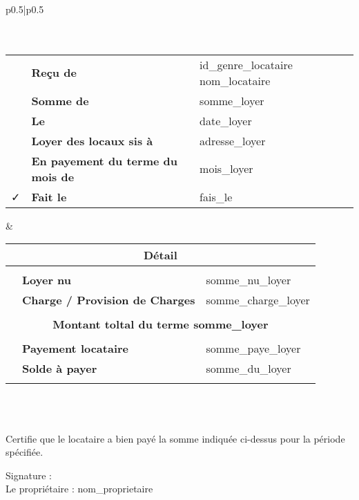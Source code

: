 \documentclass{article}
\begin{document}
\begin{tabular}{p{}|p{}}
	\hline 	
	\\
		\\
	\hline 
	\\
	\begin{tabular}{c>{\raggedleft\arraybackslash}p{}>{\raggedright\arraybackslash}p{}}
		\faFile{} &  \textbf{Reçu de} & {{id_genre_locataire}} {{nom_locataire}}\\
		\faMoney & 	\textbf{Somme de}	 & {{somme_loyer}}\\
		\faCalendar & \textbf{Le} & {{date_loyer}}\\
		\faMapMarker & \textbf{Loyer des locaux sis à } & {{adresse_loyer}}\\
		\faPencil & \textbf{En payement du terme du mois de} & {{mois_loyer}}\\
		\faCheck & \textbf{Fait le} & {{fais_le}}\\
	\end{tabular}
	& \setlength{\arrayrulewidth}{2pt} %
	\begin{tabular}{c>{\raggedleft\arraybackslash}p{}>{\raggedright\arraybackslash}p{}}	
		\multicolumn{3}{c}{\bf Détail}\\
		\hline \\
		\faHome{} & \textbf{Loyer nu} & {{somme_nu_loyer}}	\\
		\faBolt{} & \textbf{Charge / Provision de Charges} &  {{somme_charge_loyer}}	\\
		\\
		\multicolumn{3}{c}{\bf Montant toltal du terme {{somme_loyer}} }\\
		\hline \\
		\faMoney{} & \textbf{Payement locataire} & {{somme_paye_loyer}}	\\
		\faExclamationTriangle{} & \textbf{Solde à payer} &  {{somme_du_loyer}}	\\
		&\\
	\end{tabular}\\
	\hline
    \\
    \hline
\end{tabular}






\vspace{1cm}

\noindent
Certifie que le locataire a bien payé la somme indiquée ci-dessus pour la période spécifiée.

\vspace{2cm}

\noindent
Signature : \\
Le propriétaire : {{nom_proprietaire}}
\end{document}
